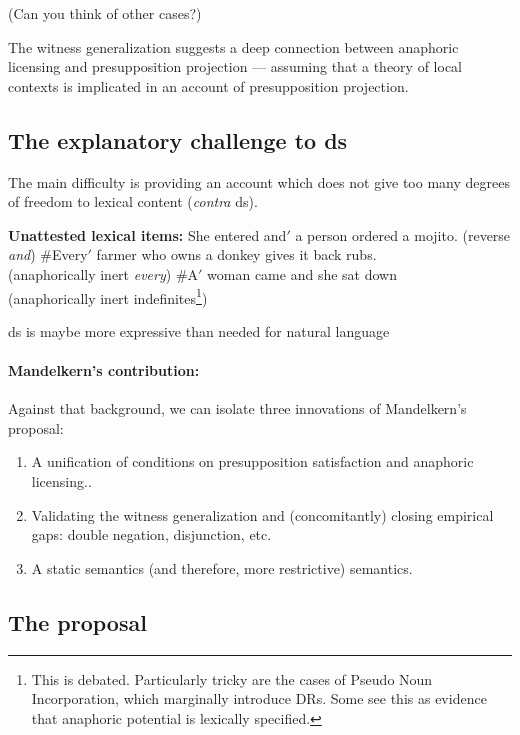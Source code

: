 \documentclass[nols,twoside,nofonts,nobib,nohyper]{tufte-handout}
\theoremstyle{observation}
\theoremstyle{theorem}
\theoremstyle{corollary}
\theoremstyle{definition}
\begin{document}
(Can you think of other cases?)

The witness generalization suggests a deep connection between anaphoric licensing and presupposition projection --- assuming that a theory of local contexts is implicated in an account of presupposition projection.

\subsection{The explanatory challenge to \ac{ds}}

The main difficulty is providing an account which does not give too many degrees of freedom to lexical content (\emph{contra} \ac{ds}).

\pex
\textbf{Unattested lexical items:}
\a
She entered and$'$ a person ordered a mojito.
\hfill (reverse \emph{and})
\a
\#Every$'$ farmer who owns a donkey gives it back rubs.	\\
\hfill (anaphorically inert \emph{every})
\a
\#A$'$ woman came and she sat down\\
\hfill (anaphorically inert indefinites\footnote{
This is debated. Particularly tricky are the cases of Pseudo Noun Incorporation, which marginally introduce DRs. Some see this as evidence that anaphoric potential is lexically specified.
})
\xe

%
\ac{ds} is maybe\footnotemark{} more expressive than needed for natural language

\paragraph{Mandelkern's contribution:}
Against that background, we can isolate three innovations of Mandelkern's proposal:
\begin{enumerate}
	\item
A unification of conditions on presupposition satisfaction and anaphoric licensing..
	\item
Validating the witness generalization and (concomitantly) closing empirical gaps: double negation, disjunction, etc.
	\item
A static semantics (and therefore, more restrictive) semantics.
\end{enumerate}

\subsection{The proposal}
\end{document}
